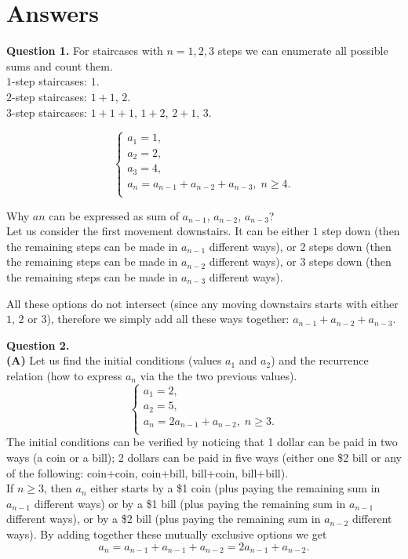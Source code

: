 \documentclass[jou]{apa6}
\begin{document}
\newpage

\section{Answers}

\vspace{10pt} 
{\bf Question 1.} For staircases with $n = 1,2,3$ steps we 
can enumerate all possible sums and count them.\\
$1$-step staircases: $1$.\\
$2$-step staircases: $1+1$, $2$.\\
$3$-step staircases: $1+1+1$, $1+2$, $2+1$, $3$.

$$\left\{ \begin{array}{l}
a_1 = 1, \\
a_2 = 2, \\
a_3 = 4, \\
a_{n} = a_{n-1} + a_{n-2} + a_{n-3},\;n \geq 4.\\
\end{array} \right.$$

Why $a{n}$ can be expressed as sum of $a_{n-1}$, $a_{n-2}$, $a_{n-3}$?\\
Let us consider the first movement downstairs. It can be either $1$ step down (then the 
remaining steps can be made in $a_{n-1}$ different ways), or $2$ steps down 
(then the remaining steps can be made in $a_{n-2}$ different ways),
or $3$ steps down (then the remaining steps can be made in $a_{n-3}$ different ways). 

All these options do not intersect (since any moving downstairs starts with either $1$, $2$ or $3$), 
therefore we simply add all these ways together: $a_{n-1} + a_{n-2} + a_{n-3}$.



\vspace{10pt} 
{\bf Question 2.}\\
{\bf (A)} Let us find the initial conditions (values $a_1$ and $a_2$) and
the recurrence relation (how to express $a_n$ via the the two previous values).
$$\left\{ \begin{array}{l}
a_1 = 2, \\
a_2 = 5, \\
a_{n} = 2a_{n-1} + a_{n-2},\;n \geq 3.\\
\end{array} \right.$$
The initial conditions can be verified by noticing that 1 dollar can be paid in two ways
(a coin or a bill); 2 dollars can be paid in five ways 
(either one \$2 bill or any of the following: coin+coin, coin+bill, bill+coin, bill+bill).\\
If $n \geq 3$, then $a_n$ either starts by a \$1 coin (plus paying the remaining sum in $a_{n-1}$ different ways)
or by a \$1 bill (plus paying the remaining sum in $a_{n-1}$ different ways), or by 
a \$2 bill (plus paying the remaining sum in $a_{n-2}$ different ways).
By adding together these mutually exclusive options we get
$$a_{n} = a_{n-1} + a_{n-1} + a_{n-2} = 2a_{n-1} + a_{n-2}.$$
\end{document}
